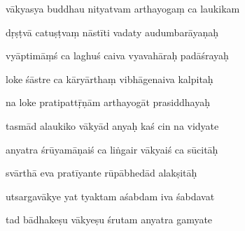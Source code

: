 \documentclass[article,12pt,a4paper]{memoir}%
\newcounter{parCount}
\begin{document}
	  
	  \pstart {} vākyasya buddhau nityatvam arthayogaṃ ca laukikam 
	{}
	\pend%
      

	  
	  \pstart \leavevmode%
	dṛṣṭvā catuṣṭvaṃ nāstīti vadaty audumbarāyaṇaḥ 
	{}
	\pend%
      

	  
	  \pstart {} vyāptimāṃś ca laghuś caiva vyavahāraḥ padāśrayaḥ 
	{}
	\pend%
      

	  
	  \pstart \leavevmode%
	loke śāstre ca kāryārthaṃ vibhāgenaiva kalpitaḥ 
	{}
	\pend%
      

	  
	  \pstart {} na loke pratipattṝṇām arthayogāt prasiddhayaḥ 
	{}
	\pend%
      

	  
	  \pstart \leavevmode%
	tasmād alaukiko vākyād anyaḥ kaś cin na vidyate 
	{}
	\pend%
      

	  
	  \pstart {} anyatra śrūyamāṇaiś ca liṅgair vākyaiś ca sūcitāḥ 
	{}
	\pend%
      

	  
	  \pstart \leavevmode%
	svārthā eva pratīyante rūpābhedād alakṣitāḥ 
	{}
	\pend%
      

	  
	  \pstart {} utsargavākye yat tyaktam aśabdam iva śabdavat 
	{}
	\pend%
      

	  
	  \pstart \leavevmode%
	tad bādhakeṣu vākyeṣu śrutam anyatra gamyate 
	{}
	\pend%
      
\end{document}
